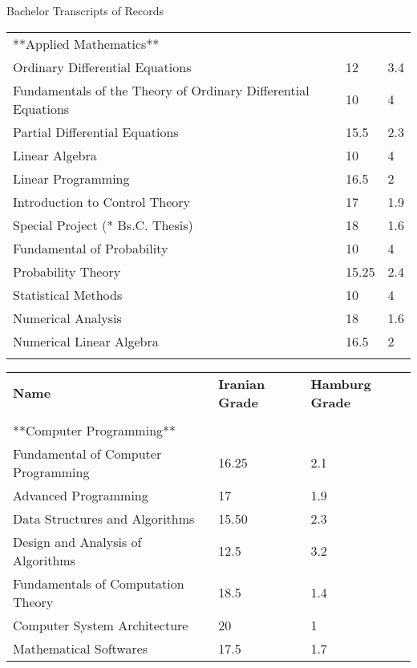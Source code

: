 \documentclass{resume} %
\begin{document}
\begin{cSection}{Bachelor Transcripts of Records}
\begin{tabular}{ @{} l l l}
	**Applied Mathematics**&&\\
	Ordinary Differential Equations & 12 & 3.4 \\ %
	Fundamentals of the Theory of Ordinary Differential Equations & 10 & 4\\ %
	Partial Differential Equations & 15.5 & 2.3 \\ %
	Linear Algebra & 10 & 4\\ %
	
	Linear Programming & 16.5 & 2\\ %
	Introduction to Control Theory & 17 & 1.9 \\ %
	
	Special Project (* Bs.C. Thesis) & 18 & 1.6\\ %
	
	Fundamental of Probability & 10 & 4\\ %
	Probability Theory & 15.25 & 2.4 \\ %
	Statistical Methods & 10 & 4 \\ %
	
	Numerical Analysis & 18 & 1.6 \\ %
	Numerical Linear Algebra & 16.5 & 2 \\ %
	\cline{1-3}\\
	
	\end{tabular}
	\begin{tabular}{ @{} l @{\hspace*{18ex}}>{}l l}
	\textbf{Name} & \textbf{Iranian Grade} & \textbf{Hamburg Grade}
		\\\cline{1-3}\\
		**Computer Programming**&&\\
		Fundamental of Computer Programming & 16.25 & 2.1\\ %
		Advanced Programming & 17 & 1.9 \\ %
		Data Structures and Algorithms & 15.50 & 2.3 \\ %
		Design and Analysis of Algorithms & 12.5 & 3.2 \\ %
		
		Fundamentals of Computation Theory & 18.5 & 1.4\\ %
		
		Computer System Architecture & 20 & 1 \\ %
		Mathematical Softwares & 17.5 & 1.7 \\ %
	\end{tabular}
\end{cSection}
\end{document}
